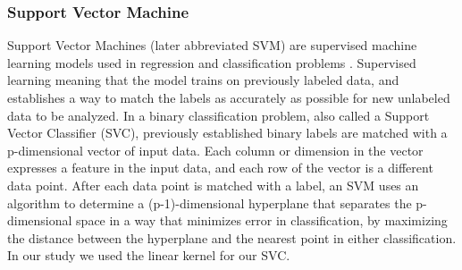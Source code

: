 \documentclass[review]{elsarticle}
\begin{document}
\subsubsection{Support Vector Machine}
\label{svm}

Support Vector Machines (later abbreviated SVM) are supervised machine learning models used in regression and classification problems \cite{svm}. Supervised learning meaning that the model trains on previously labeled data, and establishes a way to match the labels as accurately as possible for new unlabeled data to be analyzed. In a binary classification problem, also called a Support Vector Classifier (SVC), previously established binary labels are matched with a p-dimensional vector of input data. Each column or dimension in the vector expresses a feature in the input data, and each row of the vector is a different data point. After each data point is matched with a label, an SVM uses an algorithm to determine a (p-1)-dimensional hyperplane that separates the p-dimensional space in a way that minimizes error in classification, by maximizing the distance between the hyperplane and the nearest point in either classification. In our study we used the linear kernel for our SVC.





\end{document}
